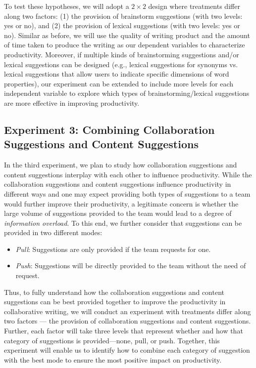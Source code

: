 To test these hypotheses, we will adopt a $2\times 2$ design where treatments differ along two factors: (1) the provision of brainstorm suggestions (with two levels: yes or no), and (2) the provision of lexical suggestions (with two levels: yes or no). Similar as before, we will use the quality of writing product and the amount of time taken to produce the writing as our dependent variables to characterize productivity. Moreover, if multiple kinds of brainstorming suggestions and/or lexical suggestions can be designed (e.g., lexical suggestions for synonyms vs. lexical suggestions that allow users to indicate specific dimensions of word properties),
our experiment can be 
extended to include more levels for each independent variable to explore which types of brainstorming/lexical suggestions are more effective in improving productivity.

\subsection{Experiment 3: Combining Collaboration Suggestions and Content Suggestions}
\label{sec:exp3}

In the third experiment, we plan to study how collaboration suggestions and content suggestions interplay with each other to influence productivity. While the collaboration suggestions and content suggestions influence productivity in different ways and one may expect providing both types of suggestions to a team would further improve their productivity, a legitimate concern is whether the large volume of suggestions provided to the team would lead to a degree of {\em information overload}. To this end, we further consider that suggestions can be provided in two different modes:
\begin{itemize}[leftmargin=*,noitemsep,topsep=0pt,parsep=0pt,partopsep=0pt]
\item {\em Pull}: Suggestions are only provided if the team requests for one.
\item {\em Push}: Suggestions will be directly provided to the team without the need of request.
\end{itemize}
Thus, to fully understand how the collaboration suggestions and content suggestions can be best provided together to improve the productivity in collaborative writing, we will conduct an experiment with treatments differ along two factors --- the provision of collaboration suggestions and content suggestions. Further, each factor will take three levels that represent whether and how that category of suggestions is provided---none, pull, or push. Together, this experiment will enable us to identify how to combine each category of suggestion with the best mode to ensure the most positive impact on productivity. 


